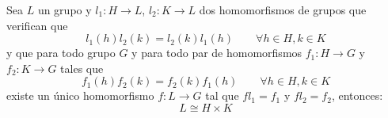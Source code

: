 \begin{teo}
   Sea $L$  un grupo y $l_1:H\to L$, $l_2:K\to L$ dos homomorfismos de grupos que verifican que
   \begin{equation*}
       l_1(h)l_2(k) = l_2(k)l_1(h) \qquad \forall h\in H, k\in K
   \end{equation*}
   y que para todo grupo $G$ y para todo par de homomorfismos $f_1:H\to G$ y $f_2:K\to G$ tales que
   \begin{equation*}
       f_1(h)f_2(k) = f_2(k)f_1(h) \qquad \forall h\in H, k\in K
   \end{equation*}
   existe un único homomorfismo $f:L\to G$ tal que $fl_1 = f_1$ y $fl_2 = f_2$, entonces:
   \begin{equation*}
       L \cong H\times K
   \end{equation*}

   \begin{figure}[H]
       \centering
   \end{figure}


\end{teo}
